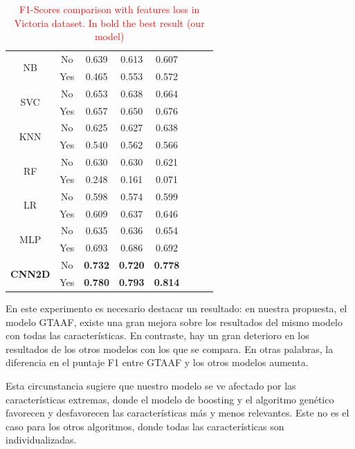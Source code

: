 \documentclass{uathesis-es}
\begin{document}
{\begin{table}[H]
\begin{center}
\begin{tabular}{|c|c||c|c|c|c|c|c|}
        \multirow{2}{*}{NB} &
            No & 0.639 & 0.613 & 0.607\\ &
		    Yes & 0.465 & 0.553 & 0.572 \\ \hline \hline
        \multirow{2}{*}{SVC} &
            No & 0.653 & 0.638 & 0.664\\ &
		    Yes & 0.657 & 0.650 & 0.676 \\ \hline \hline
        \multirow{2}{*}{KNN} &
            No & 0.625 & 0.627 & 0.638\\ &
		    Yes & 0.540 & 0.562 & 0.566 \\ \hline \hline
        \multirow{2}{*}{RF} &
            No & 0.630 & 0.630 & 0.621\\ &
		    Yes & 0.248 & 0.161 & 0.071 \\ \hline \hline
        \multirow{2}{*}{LR} &
            No & 0.598 & 0.574 & 0.599\\ &
		    Yes & 0.609 & 0.637 & 0.646 \\ \hline \hline
        \multirow{2}{*}{MLP} &
            No & 0.635 & 0.636 & 0.654\\ &
		    Yes & 0.693 & 0.686 & 0.692 \\ \hline \hline
        \multirow{2}{*}{\textbf{CNN2D}} &
            No & \textbf{0.732} & \textbf{0.720} & \textbf{0.778}\\ &
		    Yes & \textbf{0.780} & \textbf{0.793} & \textbf{0.814} \\ \hline \hline
		\end{tabular}
	\end{center}
	\caption{\textcolor{red}{F1-Scores comparison with features loss in Victoria dataset. In bold the best result (our model)}}
	\label{Victorialoss}
\end{table}

En este experimento es necesario destacar un resultado: en nuestra propuesta, el modelo GTAAF, existe una gran mejora sobre los resultados del mismo modelo con todas las características. En contraste, hay un gran deterioro en los resultados de los otros modelos con los que se compara. En otras palabras, la diferencia en el puntaje F1 entre GTAAF y los otros modelos aumenta.

Esta circunstancia sugiere que nuestro modelo se ve afectado por las características extremas, donde el modelo de boosting y el algoritmo genético favorecen y desfavorecen las características más y menos relevantes. Este no es el caso para los otros algoritmos, donde todas las características son individualizadas.

}
\end{document}
